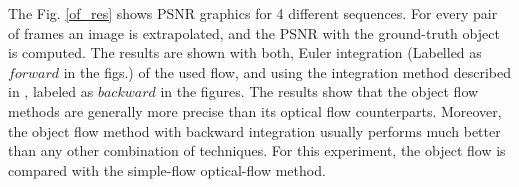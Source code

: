 The Fig. \ref{of_res} shows PSNR graphics for 4 different sequences. For every pair of frames an image is extrapolated, and the PSNR with the ground-truth object is computed.
The results are shown with both, Euler integration (Labelled as $forward$ in the figs.) of the used flow, 
and using the integration method described in \cite{c20}, labeled as $backward$ in the figures. The results show that the object flow methods are generally more precise than its optical flow 
counterparts. Moreover, the object flow method with backward integration usually performs much better than any other combination of techniques. For this experiment, the object flow is compared with the simple-flow optical-flow method.


